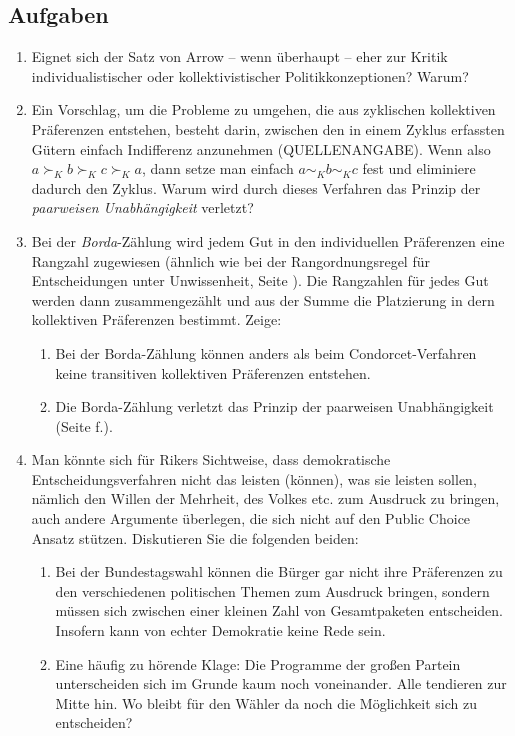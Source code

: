 \subsection{Aufgaben}

\begin{enumerate}
  \item Eignet sich der Satz von Arrow -- wenn überhaupt -- eher zur Kritik
  individualistischer oder kollektivistischer Politikkonzeptionen? Warum?
  
  \item Ein Vorschlag, um die Probleme zu umgehen, die aus zyklischen
  kollektiven Präferenzen entstehen, besteht darin, zwischen den in einem
  Zyklus erfassten Gütern einfach Indifferenz anzunehmen (QUELLENANGABE).
  Wenn also $a \succ_K b \succ_K c \succ_K a$, dann setze man einfach $a \sim_K
  b \sim_K c$ fest und eliminiere dadurch den Zyklus. Warum wird durch dieses
  Verfahren das Prinzip der {\em paarweisen Unabhängigkeit} verletzt? 
  
  \item \label{BordaAufgabe} Bei der {\em Borda}-Zählung wird jedem Gut in den
  individuellen Präferenzen eine Rangzahl zugewiesen (ähnlich wie bei der Rangordnungsregel
  für Entscheidungen unter Unwissenheit, Seite \pageref{Rangordnungsregel}).
  Die Rangzahlen für jedes Gut werden dann zusammengezählt und aus der Summe
  die Platzierung in dern kollektiven Präferenzen bestimmt. Zeige:
  \begin{enumerate}
    \item Bei der Borda-Zählung können anders als beim Condorcet-Verfahren
    keine transitiven kollektiven Präferenzen entstehen.
    \item Die Borda-Zählung verletzt das Prinzip der paarweisen Unabhängigkeit
    (Seite \pageref{ArrowVoraussetzungen}f.).
  \end{enumerate}
  
  \item Man könnte sich für Rikers Sichtweise, dass demokratische
  Entscheidungsverfahren nicht das leisten (können), was sie leisten sollen,
  nämlich den Willen der Mehrheit, des Volkes etc. zum Ausdruck zu bringen,
  auch andere Argumente überlegen, die sich nicht auf den Public Choice Ansatz
  stützen. Diskutieren Sie die folgenden beiden:
  \begin{enumerate}
    \item Bei der Bundestagswahl können die Bürger gar nicht ihre Präferenzen
    zu den verschiedenen politischen Themen zum Ausdruck bringen, sondern
    müssen sich zwischen einer kleinen Zahl von Gesamtpaketen entscheiden.
    Insofern kann von echter Demokratie keine Rede sein.
    \item Eine häufig zu hörende Klage: Die Programme der großen Partein
    unterscheiden sich im Grunde kaum noch voneinander. Alle tendieren zur
    Mitte hin. Wo bleibt für den Wähler da noch die Möglichkeit sich zu
    entscheiden?
  \end{enumerate}
\end{enumerate}
